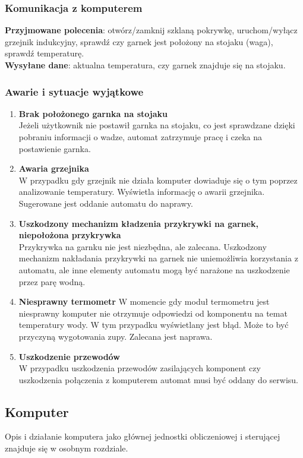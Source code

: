 \documentclass[12pt,a4paper,notitlepage]{article}
\begin{document}
\subsubsection{Komunikacja z komputerem}
\textbf{Przyjmowane polecenia}: otwórz/zamknij szklaną pokrywkę, uruchom/wyłącz grzejnik indukcyjny, sprawdź czy garnek jest położony na stojaku (waga), sprawdź temperaturę.\\
\textbf{Wysyłane dane}: aktualna temperatura, czy garnek znajduje się na stojaku.

\subsubsection{Awarie i sytuacje wyjątkowe}
\begin{enumerate}
  \item \textbf{Brak położonego garnka na stojaku}\\
Jeżeli użytkownik nie postawił garnka na stojaku, co jest sprawdzane dzięki pobraniu informacji o wadze, automat zatrzymuje pracę i czeka na postawienie garnka.
  \item \textbf{Awaria grzejnika}\\
W przypadku gdy grzejnik nie działa komputer dowiaduje się o tym poprzez analizowanie temperatury. Wyświetla informację o awarii grzejnika. Sugerowane jest oddanie automatu do naprawy.
  \item \textbf{Uszkodzony mechanizm kładzenia przykrywki na garnek, niepołożona przykrywka}\\
Przykrywka na garnku nie jest niezbędna, ale zalecana. Uszkodzony mechanizm nakładania przykrywki na garnek nie uniemożliwia korzystania z automatu, ale inne elementy automatu mogą być narażone na uszkodzenie przez parę wodną.
  \item \textbf{Niesprawny termometr}
W momencie gdy moduł termometru jest niesprawny komputer nie otrzymuje odpowiedzi od komponentu na temat temperatury wody. W tym przypadku wyświetlany jest błąd. Może to być przyczyną wygotowania zupy. Zalecana jest naprawa.
  \item \textbf{Uszkodzenie przewodów}\\
W przypadku uszkodzenia przewodów zasilających komponent czy uszkodzenia połączenia z komputerem automat musi być oddany do serwisu.
\end{enumerate}




\subsection{Komputer}
Opis i działanie komputera jako głównej jednostki obliczeniowej i sterującej znajduje się w osobnym rozdziale.
\end{document}
